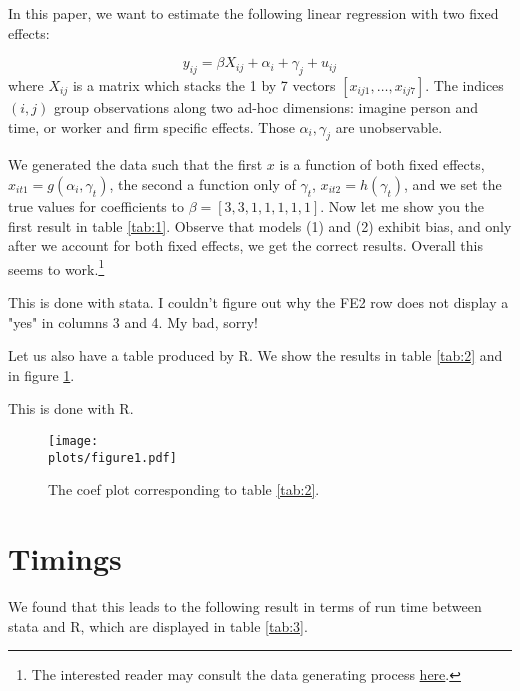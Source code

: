 \documentclass[12pt]{article}
\newcommand{\rootdir}{..}  %
\newcommand{\plots}{\rootdir/output/plots}
\newcommand{\tables}{\rootdir/output/tables}
\begin{document}
In this paper, we want to estimate the following linear regression with two fixed effects:

\begin{equation}
y_{ij} = \beta X_{ij} + \alpha_i + \gamma_j + u_{ij} \label{eq:1}
\end{equation}
where $X_{ij}$ is a matrix which stacks the 1 by 7 vectors $[ x_{ij1}, \dots, x_{ij7}]$. The indices $(i,j)$ group observations along two ad-hoc dimensions: imagine person and time, or worker and firm specific effects. Those $\alpha_i,\gamma_j$ are unobservable.

We generated the data such that the first $x$ is a function of both fixed effects, $x_{it1} = g(\alpha_i, \gamma_t)$, the second a function only of $\gamma_t$, $x_{it2} = h(\gamma_t)$, and we set the true values for coefficients to $\beta = [ 3,3,1,1,1,1,1]$. Now let me show you the first result in table \ref{tab:1}. Observe that models (1) and (2) exhibit bias, and only after we account for both fixed effects, we get the correct results. Overall this seems to work.\footnote{The interested reader may consult the data generating process \href{https://github.com/floswald/ReproData.jl/blob/main/src/ReproData.jl}{here}.}

\begin{table}
\centering

\caption{This is done with stata. I couldn't figure out why the FE2 row does not display a "yes" in columns 3 and 4. My bad, sorry!\label{tab:1}}
\end{table}
Let us also have a table produced by R. We show the results in table \ref{tab:2} and in figure \ref{fig:1}.

\begin{table}
\centering

\caption{This is done with R.\label{tab:2}}
\end{table}

\begin{figure}
\centering
\texttt{[image: \\plots/figure1.pdf]}
\caption{The coef plot corresponding to table \ref{tab:2}\label{fig:1}.}
\end{figure}

\section{Timings}

We found that this leads to the following result in terms of run time between stata and R, which are displayed in table \ref{tab:3}.
\end{document}

